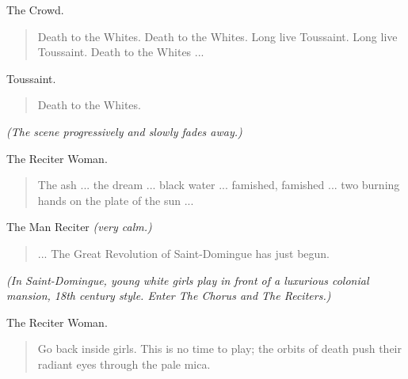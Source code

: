 \documentclass[letterpaper,article,12pt,oneside,notitlepage]{memoir}
\begin{document}
\begin{center}The Crowd.\end{center}

\begin{verse}
\indent Death to the Whites. Death to the Whites. Long live Toussaint. Long live Toussaint. Death to the Whites ... \\
\end{verse}

\begin{center}Toussaint.\end{center}

\begin{verse}
\hspace{1cm} Death to the Whites. \\
\end{verse}

\textit{(The scene progressively and slowly fades away.)}

\begin{center}The Reciter Woman.\end{center}

\begin{verse}
\indent The ash ... the dream ... black water ... famished, famished ... two burning hands on the plate of the sun ... \\
\end{verse}

\begin{center}The Man Reciter \textit{(very calm.)}\end{center}

\begin{verse}
\hspace{1cm} ... The Great Revolution of Saint-Domingue has just begun. \\
\end{verse}

\textit{(In Saint-Domingue, young white girls play in front of a luxurious colonial mansion, 18th century style. Enter The Chorus and The Reciters.)} 

\begin{center}The Reciter Woman.\end{center}

\begin{verse}
\indent Go back inside girls. This is no time to play; the orbits of death push their radiant eyes through the pale mica. \\
\end{verse}
\end{document}

